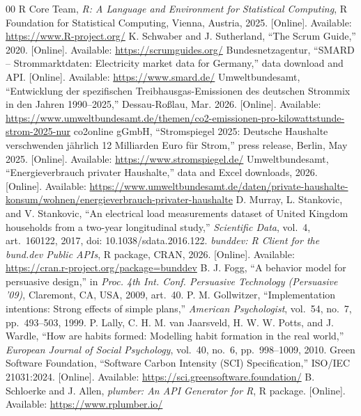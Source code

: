 \documentclass[conference]{IEEEtran}
\begin{document}
\begin{thebibliography}{00}
 R Core Team, \emph{R: A Language and Environment for Statistical Computing}, R Foundation for Statistical Computing, Vienna, Austria, 2025. [Online]. Available: \url{https://www.R-project.org/}
 K. Schwaber and J. Sutherland, ``The Scrum Guide,'' 2020. [Online]. Available: \url{https://scrumguides.org/}
 Bundesnetzagentur, ``SMARD -- Strommarktdaten: Electricity market data for Germany,'' data download and API. [Online]. Available: \url{https://www.smard.de/}
 Umweltbundesamt, ``Entwicklung der spezifischen Treibhausgas-Emissionen des deutschen Strommix in den Jahren 1990--2025,'' Dessau-Ro\ss lau, Mar. 2026. [Online]. Available: \url{https://www.umweltbundesamt.de/themen/co2-emissionen-pro-kilowattstunde-strom-2025-nur}
 co2online gGmbH, ``Stromspiegel 2025: Deutsche Haushalte verschwenden j\"ahrlich 12 Milliarden Euro f\"ur Strom,'' press release, Berlin, May 2025. [Online]. Available: \url{https://www.stromspiegel.de/}
 Umweltbundesamt, ``Energieverbrauch privater Haushalte,'' data and Excel downloads, 2026. [Online]. Available: \url{https://www.umweltbundesamt.de/daten/private-haushalte-konsum/wohnen/energieverbrauch-privater-haushalte}
 D. Murray, L. Stankovic, and V. Stankovic, ``An electrical load measurements dataset of United Kingdom households from a two-year longitudinal study,'' \emph{Scientific Data}, vol.~4, art.~160122, 2017, doi: 10.1038/sdata.2016.122.
 \emph{bunddev: R Client for the bund.dev Public APIs}, R package, CRAN, 2026. [Online]. Available: \url{https://cran.r-project.org/package=bunddev}
 B. J. Fogg, ``A behavior model for persuasive design,'' in \emph{Proc. 4th Int. Conf. Persuasive Technology (Persuasive '09)}, Claremont, CA, USA, 2009, art.~40.
 P. M. Gollwitzer, ``Implementation intentions: Strong effects of simple plans,'' \emph{American Psychologist}, vol.~54, no.~7, pp.~493--503, 1999.
 P. Lally, C. H. M. van Jaarsveld, H. W. W. Potts, and J. Wardle, ``How are habits formed: Modelling habit formation in the real world,'' \emph{European Journal of Social Psychology}, vol.~40, no.~6, pp.~998--1009, 2010.
 Green Software Foundation, ``Software Carbon Intensity (SCI) Specification,'' ISO/IEC 21031:2024. [Online]. Available: \url{https://sci.greensoftware.foundation/}
 B. Schloerke and J. Allen, \emph{plumber: An API Generator for R}, R package. [Online]. Available: \url{https://www.rplumber.io/}

\end{thebibliography}
\end{document}
